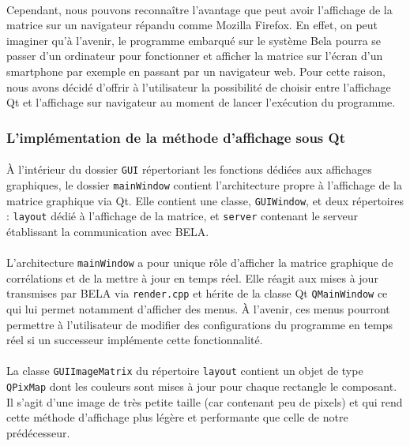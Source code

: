 \paragraph{}
Cependant, nous pouvons reconnaître l'avantage que peut avoir
l'affichage de la matrice sur un navigateur répandu comme Mozilla
Firefox. En effet, on peut imaginer qu'à l'avenir, le programme
embarqué sur le système Bela pourra se passer d'un ordinateur pour
fonctionner et afficher la matrice sur l'écran d'un smartphone par
exemple en passant par un navigateur web. Pour cette raison, nous
avons décidé d'offrir à l'utilisateur la possibilité de choisir entre
l'affichage Qt et l'affichage sur navigateur au moment de lancer
l'exécution du programme.

\subsubsection{L'implémentation de la méthode d'affichage sous Qt}
\paragraph{}
\`{A} l'intérieur du dossier \verb!GUI! répertoriant les fonctions
dédiées aux affichages graphiques, le dossier \verb!mainWindow!
contient l'architecture propre à l'affichage de la matrice graphique
via Qt. Elle contient une classe, \verb!GUIWindow!, et deux
répertoires : \verb!layout! dédié à l'affichage de la matrice, et
\verb!server! contenant le serveur établissant la communication avec
BELA.
\paragraph{}
L'architecture \verb!mainWindow! a pour unique rôle d'afficher la
matrice graphique de corrélations et de la mettre à jour en temps
réel. Elle réagit aux mises à jour transmises par BELA via
\verb!render.cpp! et hérite de la classe Qt \verb!QMainWindow! ce qui
lui permet notamment d'afficher des menus. \`{A} l'avenir, ces menus
pourront permettre à l'utilisateur de modifier des configurations du
programme en temps réel si un successeur implémente cette
fonctionnalité.


\paragraph{}
La classe \verb!GUIImageMatrix! du répertoire \verb!layout! contient
un objet de type \verb!QPixMap! dont les couleurs sont mises à jour
pour chaque rectangle le composant. Il s'agit d'une image de très
petite taille (car contenant peu de pixels) et qui rend cette méthode
d'affichage plus légère et performante que celle de notre
prédécesseur.

